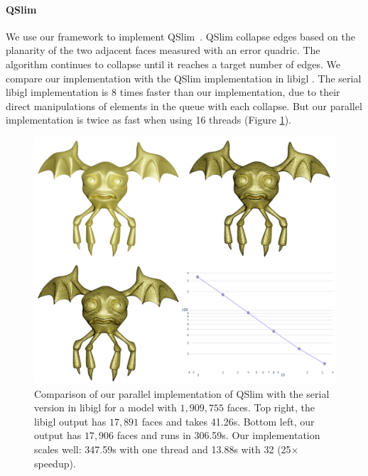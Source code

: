 \paragraph{QSlim}
{We use our framework to implement QSlim~\cite{garland1997surface}. 
QSlim collapse edges based on the planarity of the two adjacent faces measured with an error quadric. The algorithm continues to collapse until it reaches a target number of edges. We compare our implementation with the QSlim implementation in libigl \cite{jacobson2016libigl}. The serial libigl implementation is 8 times faster than our implementation, due to their direct manipulations of elements in the queue with each collapse. But our parallel implementation is twice as fast when using 16 threads (Figure \ref{fig:qslim})}.

\begin{figure}
    \centering\footnotesize
    \includegraphics[width=\linewidth]{wmtk-tex/figs/2d-qslim.pdf}
    \caption{{Comparison of our parallel implementation of QSlim with the serial version in libigl for a model with $1,909,755$ faces. Top right, the libigl output has $17,891$ faces and takes 41.26s. Bottom left, our output has $17,906$ faces and runs in 306.59s.  Our implementation scales well: 347.59s with one thread and 13.88s with 32 (25$\times$ speedup).}
    }
    \label{fig:qslim}
\end{figure}



